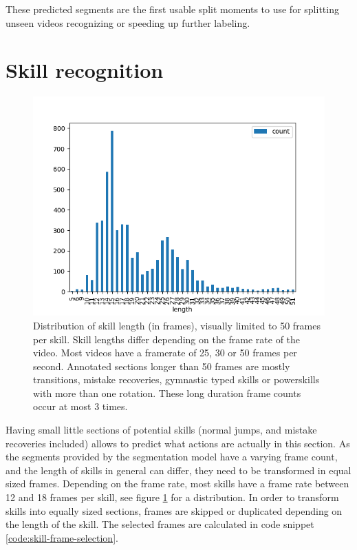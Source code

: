 These predicted segments are the first usable split moments to use for splitting unseen videos recognizing or speeding up further labeling.


\section{Skill recognition}
\label{results:recognition}

\begin{figure}
    \centering
    \includegraphics[width=0.95\linewidth]{img/skilllengths}
    \caption[frame counts of skill lengths]{Distribution of skill length (in frames), visually limited to 50 frames per skill. Skill lengths differ depending on the frame rate of the video. Most videos have a framerate of 25, 30 or 50 frames per second. Annotated sections longer than 50 frames are mostly transitions, mistake recoveries, gymnastic typed skills or powerskills with more than one rotation. These long duration frame counts occur at most 3 times.}
    \label{fig:skilllengths-counts}
\end{figure}


Having small little sections of potential skills (normal jumps, and mistake recoveries included) allows to predict what actions are actually in this section.
As the segments provided by the segmentation model have a varying frame count, and the length of skills in general can differ, they need to be transformed in equal sized frames.
Depending on the frame rate, most skills have a frame rate between 12 and 18 frames per skill, see figure \ref{fig:skilllengths-counts} for a distribution. In order to transform skills into equally sized sections, frames are skipped or duplicated depending on the length of the skill.
The selected frames are calculated in code snippet \ref{code:skill-frame-selection}.


